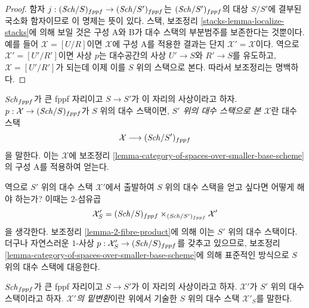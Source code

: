 \begin{proof}
함자 $j : (\mathit{Sch}/S)_{fppf} \to (\mathit{Sch}/S')_{fppf}$는
$(\mathit{Sch}/S')_{fppf}$의 대상 $S/S'$에 결부된 국소화 함자이므로 이 명제는
뜻이 있다. 스택, 보조정리 \ref{stacks-lemma-localize-stacks}에 의해 보일
것은 구성 A와 B가 대수 스택의 부분범주를 보존한다는 것뿐이다. 예를 들어
$\mathcal{X} = [U/R]$이면 $\mathcal{X}$에 구성 A를 적용한 결과는 단지
$\mathcal{X}' = \mathcal{X}$이다. 역으로 $\mathcal{X}' = [U'/R']$이면
사상 $p$는 대수공간의 사상 $U' \to S$와 $R' \to S$를 유도하고,
$\mathcal{X} = [U'/R']$가 되는데 이제 이를 $S$ 위의 스택으로 본다. 따라서
보조정리는 명백하다.
\end{proof}

\begin{definition}
\label{definition-viewed-as}
$\mathit{Sch}_{fppf}$가 큰 fppf 자리이고 $S \to S'$가 이 자리의 사상이라고 하자.
$p : \mathcal{X} \to (\mathit{Sch}/S)_{fppf}$가 $S$ 위의 대수 스택이면,
{\it $S'$ 위의 대수 스택으로 본 $\mathcal{X}$}란 대수 스택
$$
\mathcal{X} \longrightarrow (\mathit{Sch}/S')_{fppf}
$$
을 말한다. 이는 $\mathcal{X}$에 보조정리
\ref{lemma-category-of-spaces-over-smaller-base-scheme}의 구성 A를 적용하여
얻는다.
\end{definition}

\noindent
역으로 $S'$ 위의 대수 스택 $\mathcal{X}'$에서 출발하여 $S$ 위의 대수
스택을 얻고 싶다면 어떻게 해야 하는가? 이때는 $2$-섬유곱
$$
\mathcal{X}'_S
=
(\mathit{Sch}/S)_{fppf} \times_{(\mathit{Sch}/S')_{fppf}} \mathcal{X}'
$$
을 생각한다. 보조정리 \ref{lemma-2-fibre-product}에 의해 이는 $S'$ 위의
대수 스택이다. 더구나 자연스러운 $1$-사상
$p : \mathcal{X}'_S \to (\mathit{Sch}/S)_{fppf}$를 갖추고 있으므로, 보조정리
\ref{lemma-category-of-spaces-over-smaller-base-scheme}에 의해 표준적인
방식으로 $S$ 위의 대수 스택에 대응한다.

\begin{definition}
\label{definition-change-of-base}
$\mathit{Sch}_{fppf}$가 큰 fppf 자리이고 $S \to S'$가 이 자리의 사상이라고 하자.
$\mathcal{X}'$가 $S'$ 위의 대수 스택이라고 하자. {\it $\mathcal{X}'$의
밑변환}이란 위에서 기술한 $S$ 위의 대수 스택 $\mathcal{X}'_S$를 말한다.
\end{definition}










